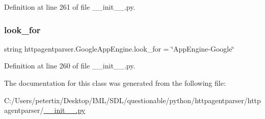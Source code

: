 Definition at line 261 of file \+\_\+\+\_\+init\+\_\+\+\_\+.\+py.

\hypertarget{classhttpagentparser_1_1_google_app_engine_a4e628c81f7a56fddcfb772393a19bd05}{}\label{classhttpagentparser_1_1_google_app_engine_a4e628c81f7a56fddcfb772393a19bd05} 
\subsubsection{\texorpdfstring{look\+\_\+for}{look\_for}}
{\footnotesize\ttfamily string httpagentparser.\+Google\+App\+Engine.\+look\+\_\+for = \char`\"{}App\+Engine-\/Google\char`\"{}\hspace{0.3cm}{\ttfamily [static]}}



Definition at line 260 of file \+\_\+\+\_\+init\+\_\+\+\_\+.\+py.



The documentation for this class was generated from the following file\+:\begin{DoxyCompactItemize}
\item 
C\+:/\+Users/petertix/\+Desktop/\+I\+M\+L/\+S\+D\+L/questionable/python/httpagentparser/httpagentparser/\hyperlink{____init_____8py}{\+\_\+\+\_\+init\+\_\+\+\_\+.\+py}\end{DoxyCompactItemize}
